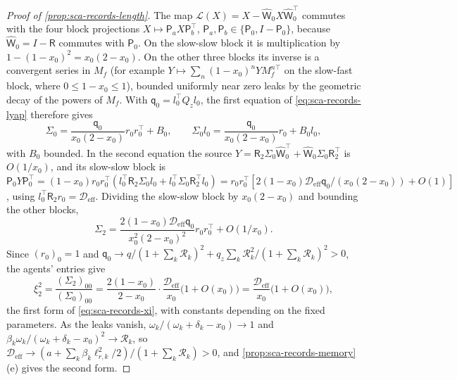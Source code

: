 \begin{proof}[Proof of \cref{prop:sca-records-length}]
The map $\mathcal L(X)=X-\hat{\mathsf W}_0X\hat{\mathsf W}_0^\top$ commutes with the four block projections $X\mapsto\mathsf P_aX\mathsf P_b^\top$, $\mathsf P_a,\mathsf P_b\in\{\mathsf P_0,I-\mathsf P_0\}$, because $\hat{\mathsf W}_0=I-\mathsf R$ commutes with $\mathsf P_0$. On the slow-slow block it is multiplication by $1-(1-x_0)^2=x_0(2-x_0)$. On the other three blocks its inverse is a convergent series in $M_f$ (for example $Y\mapsto\sum_n(1-x_0)^nYM_f^{n\top}$ on the slow-fast block, where $0\le1-x_0\le1$), bounded uniformly near zero leaks by the geometric decay of the powers of $M_f$. With $\mathsf q_0=l_0^\top Q_zl_0$, the first equation of \eqref{eq:sca-records-lyap} therefore gives
\begin{equation*}
\Sigma_0=\frac{\mathsf q_0}{x_0(2-x_0)}r_0r_0^\top+B_0,\qquad\Sigma_0l_0=\frac{\mathsf q_0}{x_0(2-x_0)}r_0+B_0l_0,
\end{equation*}
with $B_0$ bounded. In the second equation the source $Y=\mathsf R_2\Sigma_0\hat{\mathsf W}_0^\top+\hat{\mathsf W}_0\Sigma_0\mathsf R_2^\top$ is $O(1/x_0)$, and its slow-slow block is $\mathsf P_0Y\mathsf P_0^\top=(1-x_0)r_0r_0^\top(l_0^\top\mathsf R_2\Sigma_0l_0+l_0^\top\Sigma_0\mathsf R_2^\top l_0)=r_0r_0^\top[2(1-x_0)\mathcal D_{\mathrm{eff}}\mathsf q_0/(x_0(2-x_0))+O(1)]$, using $l_0^\top\mathsf R_2r_0=\mathcal D_{\mathrm{eff}}$. Dividing the slow-slow block by $x_0(2-x_0)$ and bounding the other blocks,
\begin{equation*}
\Sigma_2=\frac{2(1-x_0)\mathcal D_{\mathrm{eff}}\mathsf q_0}{x_0^2(2-x_0)^2}r_0r_0^\top+O(1/x_0).
\end{equation*}
Since $(r_0)_0=1$ and $\mathsf q_0\to q/(1+\sum_k\mathcal R_k)^2+q_z\sum_k\mathcal R_k^2/(1+\sum_k\mathcal R_k)^2>0$, the agents' entries give
\begin{equation*}
\xi_2^2=\frac{(\Sigma_2)_{00}}{(\Sigma_0)_{00}}=\frac{2(1-x_0)}{2-x_0}\cdot\frac{\mathcal D_{\mathrm{eff}}}{x_0}\bigl(1+O(x_0)\bigr)=\frac{\mathcal D_{\mathrm{eff}}}{x_0}\bigl(1+O(x_0)\bigr),
\end{equation*}
the first form of \eqref{eq:sca-records-xi}, with constants depending on the fixed parameters. As the leaks vanish, $\omega_k/(\omega_k+\delta_k-x_0)\to1$ and $\beta_k\omega_k/(\omega_k+\delta_k-x_0)^2\to\mathcal R_k$, so $\mathcal D_{\mathrm{eff}}\to(a+\sum_k\beta_k\ell_{r,k}^2/2)/(1+\sum_k\mathcal R_k)>0$, and \cref{prop:sca-records-memory}(e) gives the second form.


\end{proof}
